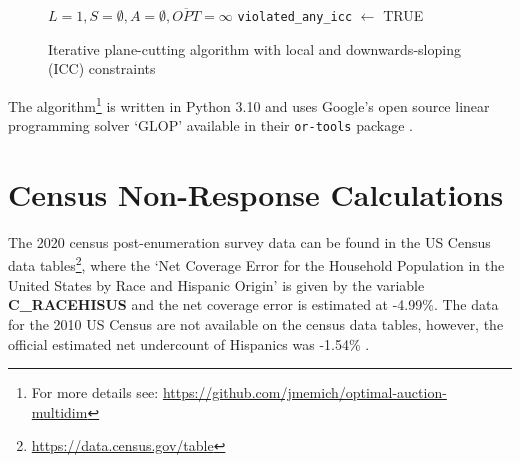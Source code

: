 \begin{figure}[t]
  \centering
  \begin{minipage}{.7\linewidth}
    \begin{algorithm}[H]
    \caption{Iterative plane-cutting algorithm with local and downwards-sloping (ICC) constraints}\label{alg:1}
    \SetAlgoLined
    $L = 1, S = \emptyset, A = \emptyset, \overline{OPT} = \infty$\;
    \texttt{violated\_any\_icc} $\gets $ TRUE\; 
    \end{algorithm}
  \end{minipage}
\end{figure}

The algorithm\footnote{For more details see: \url{https://github.com/jmemich/optimal-auction-multidim}} is written in Python 3.10 and uses Google's open source linear programming solver `GLOP' available in their \texttt{or-tools} package \autocite{ortools}.

\section{Census Non-Response Calculations}\label{appendix_census_calc}

The 2020 census post-enumeration survey data can be found in the US Census data tables\footnote{\url{https://data.census.gov/table}}, where the `Net Coverage Error for the Household Population in the United States by Race and Hispanic Origin' is given by the variable \textbf{C\_RACEHISUS} and the net coverage error is estimated at -4.99\%. The data for the 2010 US Census are not available on the census data tables, however, the official estimated net undercount of Hispanics was -1.54\% \autocite[p1]{census2010coverage}.




